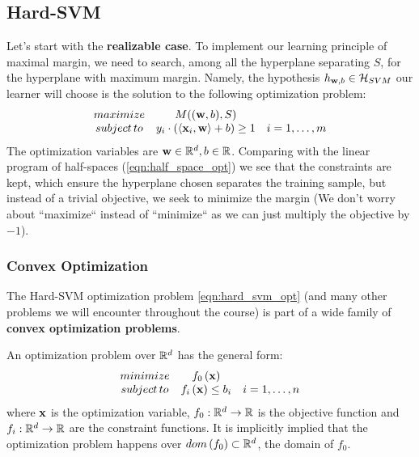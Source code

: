 \subsection{Hard-SVM}
Let's start with the \textbf{realizable case}. To implement our learning principle of maximal margin, we need to search, among all the hyperplane separating $S$, for the hyperplane with maximum margin. Namely, the hypothesis $h_{\mathbf{w},b} \in \mathcal{H}_{SVM}$ our learner will choose is the solution to the following optimization problem:
\begin{equation}
\begin{array}{ccc}
maximize & M( (\mathbf{w},b) , S) & \\
subject \, to & y_i \cdot \left( \left\langle \mathbf{x}_i,\mathbf{w}\right\rangle+b \right) \geq 1 & i=1,\ldots,m\\
\end{array}
\label{eqn:hard_svm_opt}
\end{equation}
The optimization variables are $\mathbf{w}\in\mathbb{R}^d,b\in\mathbb{R}$. Comparing with the linear program of half-spaces (\ref{eqn:half_space_opt}) we see that the constraints are kept, which ensure the hyperplane chosen separates the training sample, but instead of a trivial objective, we seek to minimize the margin (We don't worry about ``maximize`` instead of ``minimize`` as we can just multiply the objective by $-1$). 

\subsubsection{Convex Optimization}
The Hard-SVM optimization problem \ref{eqn:hard_svm_opt} (and many other problems we will encounter throughout the course) is part of a wide family of \textbf{convex optimization problems}.

\begin{definition}
An optimization problem over $\mathbb{R}^d$ has the general form:
\begin{equation*}
\begin{array}{ccc}
minimize & f_0\left(\mathbf{x}\right) & \\
subject \, to & f_i\left(\mathbf{x}\right)\leq b_i & i=1,\ldots,n\\
\end{array}
\end{equation*}
where $\mathbf{x}$ is the optimization variable, $f_0:\mathbb{R}^d\rightarrow\mathbb{R}$ is the objective function and $f_i:\mathbb{R}^d\rightarrow\mathbb{R}$ are the constraint functions. It is implicitly implied that the optimization problem happens over $dom\left(f_0\right)\subset\mathbb{R}^d$, the domain of $f_0$.
\end{definition}

